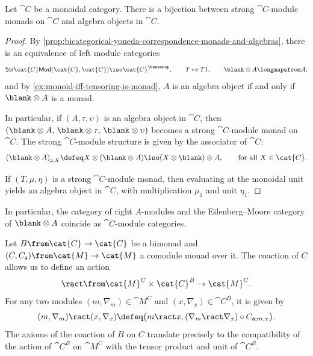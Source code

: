 \begin{proposition}\label{prop:strong-module-monad-and-algebra-objects}
  Let \(\cat{C}\) be a monoidal category.
  There is a bijection between strong \(\cat{C}\)\hyp{}module monads on \(\cat{C}\)
  and algebra objects in \(\cat{C}\).
\end{proposition}
\begin{proof}
  By \cref{prop:bicategorical-yoneda-correspondence-monads-and-algebras},
  there is an equivalence of left module categories
  \begin{align*}
    \mathsf{Str}\cat{C}\mathsf{Mod}(\cat{C}, \cat{C}) \iso \cat{C}^{\tensorop}, \qquad
    T \mapsto T1, \qquad
    \blank \otimes A \longmapsfrom A,
  \end{align*}
  and by \cref{ex:monoid-iff-tensoring-is-monad}, \(A\) is an algebra object if and only if \(\blank \otimes A\) is a monad.

  In particular, if \((A, \tau, \upsilon)\) is an algebra object in \(\cat{C}\),
  then \((\blank \otimes A,\, \blank \otimes \tau,\, \blank \otimes \upsilon)\) becomes a strong \(\cat{C}\)\hyp{}module monad on \(\cat{C}\).
  The strong \(\cat{C}\)\hyp{}module structure is given by the associator of \(\cat{C}\):
  \[
    {(\blank \otimes A)}_{\mathsf{a};X} \defeq X \otimes (\blank \otimes A) \iso (X \otimes \blank) \otimes A, \qquad\text{for all \(X \in \cat{C}\)}.
  \]

  If \((T, \mu, \eta)\) is a strong \(\cat{C}\)\hyp{}module monad,
  then evaluating at the monoidal unit yields an algebra object in \(\cat{C}\),
  with multiplication \(\mu_1\) and unit \(\eta_1\).
\end{proof}

In particular, the category of right \(A\)\hyp{}modules and the Eilenberg–Moore category of \(\blank \otimes A\) coincide as \(\cat{C}\)\hyp{}module categories.

\begin{remark}\label{rem:comodule-monads-induce-module-categories}
  Let \(B \from \cat{C} \to \cat{C}\) be a bimonad and  \((C, C_{\mathsf{a}}) \from \cat{M} \to \cat{M}\) a comodule monad over it.
  The coaction of \(C\) allows us to define an action
  \[
    \ract \from \cat{M}^{C}\times \cat{C}^B \to \cat{M}^C.
  \]
  For any two modules \((m, \nabla_{m}) \in \cat{M}^C\) and \((x, \nabla_{x}) \in \cat{C}^B\), it is given by
  \[
    (m, \nabla_{m}) \ract (x, \nabla_{x}) \defeq \big(m \ract x, (\nabla_{m}\ract \nabla_{x}) \circ C_{\mathsf{a};m,x} \big).
  \]
  The axioms of the coaction of \(B\) on \(C\) translate precisely to the compatibility of the action of \(\cat{C}^B\) on \(\cat{M}^{C}\) with the tensor product and unit of \(\cat{C}^B\).
\end{remark}

